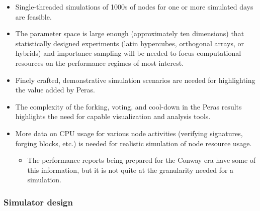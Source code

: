 \documentclass[10pt]{article}
\providecommand{\tightlist}{%
  \setlength{\itemsep}{0pt}\setlength{\parskip}{0pt}}
\begin{document}
\begin{itemize}
\tightlist
\item
  Single-threaded simulations of 1000s of nodes for one or more
  simulated days are feasible.
\item
  The parameter space is large enough (approximately ten dimensions)
  that statistically designed experiments (latin hypercubes, orthogonal
  arrays, or hybrids) and importance sampling will be needed to focus
  computational resources on the performance regimes of most interest.
\item
  Finely crafted, demonstrative simulation scenarios are needed for
  highlighting the value added by Peras.
\item
  The complexity of the forking, voting, and cool-down in the Peras
  results highlights the need for capable visualization and analysis
  tools.
\item
  More data on CPU usage for various node activities (verifying
  signatures, forging blocks, etc.) is needed for realistic simulation
  of node resource usage.

  \begin{itemize}
  \tightlist
  \item
    The performance reports being prepared for the Conway era have some
    of this information, but it is not quite at the granularity needed
    for a simulation.
  \end{itemize}
\end{itemize}

\subsubsection{Simulator design}\label{simulator-design}
\end{document}
